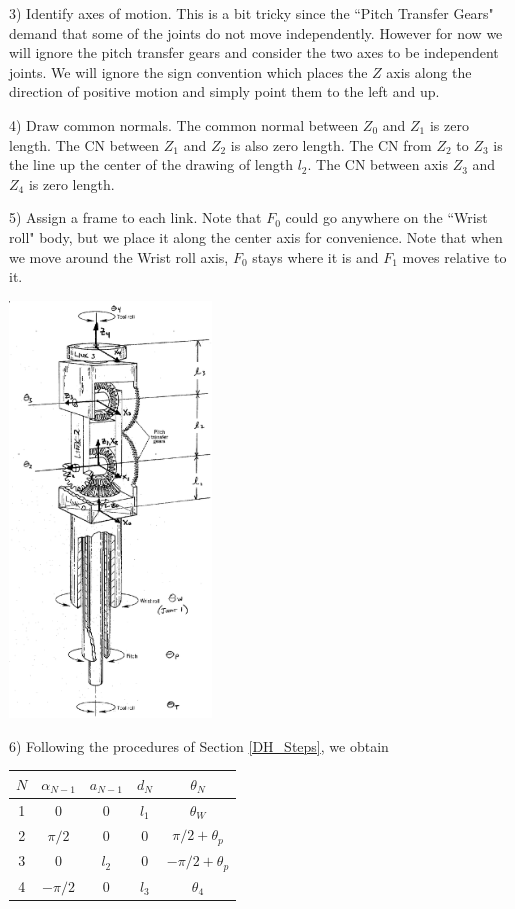 \newpage
\begin{ExampleCont}
3) Identify axes of motion.  This is a bit tricky since the ``Pitch Transfer Gears" demand that some of the joints do not move independently.  However for now we will ignore the pitch transfer gears and consider the two axes to be independent joints.  We will ignore the sign convention which places the $Z$ axis along the direction of positive motion and simply point them to the left and up.

4) Draw common normals.   The common normal between $Z_0$ and $Z_1$ is zero length.  The CN between $Z_1$ and $Z_2$ is also zero length.   The CN from $Z_2$ to $Z_3$ is the line up the center of the drawing of length $l_2$.  The CN between axis $Z_3$ and $Z_4$ is zero length.

5) Assign a frame to each link.   Note that $F_0$ could go anywhere on the ``Wrist roll" body, but we place it  along the center axis for convenience.  Note that when we move around the Wrist roll axis, $F_0$ stays where it is and $F_1$ moves relative to it.

\includegraphics[width=5.38cm]{figs03/00423.eps}
\vspace{0.25in}

6) Following the procedures of Section \ref{DH_Steps}, we obtain
\vspace{0.25in}

\begin{tabular}{|c|c|c|c|c|} \hline
$N$	&  $\alpha_{N-1}$   &  $a_{N-1}$    	& $d_N$		&  $\theta_N$  \\     \hline
1	&   0 		    &    0 	    	&  $l_1$	&    $\theta_W$        \\ \hline
2	&   $\pi/2 $	    &    0       	&   0		& $\pi/2 + \theta_p$        	\\ \hline
3	&   0		    &   $l_2$		&  0		& $-\pi/2 + \theta_p$		\\ \hline
4	&   $-\pi/2 $       &   0		&  $l_3$	& $\theta_4$       		\\ \hline
\end{tabular}


\end{ExampleCont}
